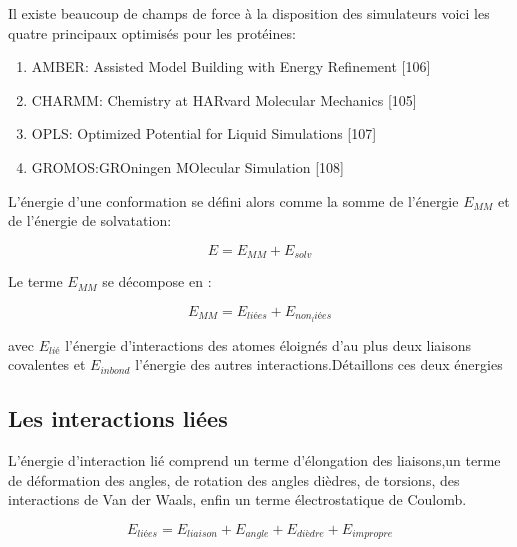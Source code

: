 Il existe beaucoup de champs de force à la disposition des simulateurs voici les quatre principaux optimisés pour les protéines:

\begin{enumerate}
\item AMBER: Assisted Model Building with Energy Refinement [106]
\item CHARMM: Chemistry at HARvard Molecular Mechanics [105]
\item OPLS: Optimized Potential for Liquid Simulations [107]
\item GROMOS:GROningen MOlecular Simulation [108]
\end{enumerate}

L'énergie d'une conformation se défini alors comme la somme de l'énergie $E_{MM}$  et de l'énergie de solvatation:

\begin{equation}
  E = E_{MM} + E_{solv}
\end{equation}

Le terme $E_{MM}$ se décompose en :

\begin{equation}
  E_{MM} = E_{liées} + E_{non_liées}
\end{equation}

avec $E_{lié}$ l'énergie d'interactions des atomes éloignés d'au plus deux liaisons covalentes et $E_{inbond}$  l'énergie des autres interactions.Détaillons ces deux énergies

\subsection{Les interactions liées }

L'énergie d'interaction lié comprend un terme d'élongation des liaisons,un terme de déformation des angles, de rotation des angles dièdres, de torsions, des interactions de Van der Waals, enfin un terme électrostatique de Coulomb.


\begin{equation}
  E_{liées} = E_{liaison} + E_{angle} +E_{dièdre} + E_{impropre}
\end{equation}


